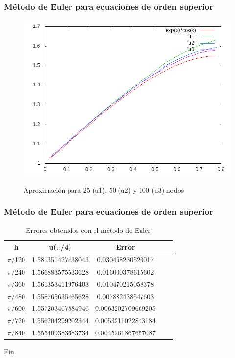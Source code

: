 \documentclass{beamer}
\begin{document}
\begin{frame}
	\frametitle{Método de Euler para ecuaciones de orden superior}

	\begin{figure}[H]
	\centering
	\includegraphics[scale=0.45]{img/graphic.png}
	\label{figura1}
	\caption{Aproximación para 25 (u1), 50 (u2) y 100 (u3) nodos} 
	\end{figure}


\end{frame}


\begin{frame}
	\frametitle{Método de Euler para ecuaciones de orden superior}

    \begin{table}[H]
        \centering
        \setlength\extrarowheight{3pt}
        
        \begin{tabular}{|c|c|c|c|c}
            \hline
            \textbf{h} & {\textbf{u($\pi$/4)}} & \textbf{Error} \\ 
            \hline
                $\pi$/120 & 1.581351427438043 & 0.030468230520017\\
            \hline
                $\pi$/240 & 1.566883575533628 & 0.016000378615602\\
            \hline
                $\pi$/360 & 1.561353411976403 & 0.010470215058378\\
            \hline
                $\pi$/480 & 1.558765635465628 & 0.007882438547603\\
            \hline
                $\pi$/600 & 1.557203467884946 & 0.0063202709669205\\
            \hline
                $\pi$/720 &  1.556204299202344 & 0.0053211022843184\\
            \hline
                $\pi$/840 & 1.555409383683734 & 0.0045261867657087\\
            \hline
        \end{tabular}
        
        \caption{Errores obtenidos con el método de Euler}           
    \end{table}

\end{frame}

\begin{frame}
\Huge{\centerline{Fin.}}
\end{frame}

\end{document}
